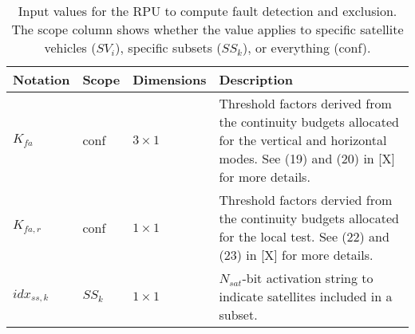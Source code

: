\documentclass[11pt]{article}
\begin{document}
\begin{table}[htbp] \centering
  \caption{Input values for the RPU to compute fault detection and exclusion. The scope column shows whether the value applies to specific satellite vehicles ($SV_i$), specific subsets ($SS_k$), or everything (conf).}
  \label{tab:rpu_fde_input}
  \begin{tabular}{|m{2cm}|m{1.5cm}|m{2.5cm}|m{7cm}|}
    \hline
    \textbf{Notation} & \textbf{Scope} & \textbf{Dimensions} & \textbf{Description}\\ \hline
    $K_{fa}$ & conf & $3 \times 1$ & Threshold factors derived from the continuity budgets allocated for the vertical and horizontal modes. See (19) and (20) in [X] for more details.\\ \hline
    $K_{fa,r}$ & conf & $1 \times 1$ & Threshold factors dervied from the continuity budgets allocated for the local test. See (22) and (23) in [X] for more details.\\ \hline
    $idx_{ss,k}$ & $SS_k$ & $1 \times 1$ & $N_{sat}$-bit activation string to indicate satellites included in a subset.\\ \hline
  \end{tabular}
\end{table}
\end{document}
